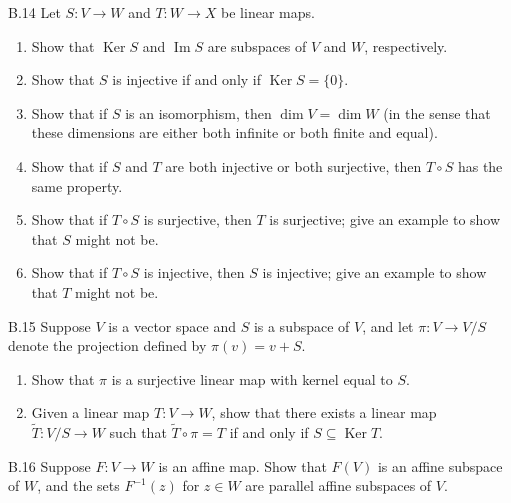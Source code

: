 \begin{exercise}{B.14}
    Let \( S : V \to W \) and \( T : W \to X \) be linear maps.
    \begin{enumerate}[label={(\alph*)}]
        \item Show that \( \operatorname{Ker} S \) and \( \operatorname{Im} S \) are subspaces of \( V \) and \( W \), respectively.
        \item Show that \( S \) is injective if and only if \( \operatorname{Ker} S = \{0\} \).
        \item Show that if \( S \) is an isomorphism, then \( \dim V = \dim W \) (in the sense that these dimensions are either both infinite or both finite and equal).
        \item Show that if \( S \) and \( T \) are both injective or both surjective, then \( T \circ S \) has the same property.
        \item Show that if \( T \circ S \) is surjective, then \( T \) is surjective; give an example to show that \( S \) might not be.
        \item Show that if \( T \circ S \) is injective, then \( S \) is injective; give an example to show that \( T \) might not be.
    \end{enumerate}
\end{exercise}

\begin{exercise}{B.15}
    Suppose \( V \) is a vector space and \( S \) is a subspace of \( V \), and let \( \pi : V \to V/S \) denote the projection defined by \( \pi(v) = v + S \).
    \begin{enumerate}[label={(\alph*)}]
        \item Show that \( \pi \) is a surjective linear map with kernel equal to \( S \).
        \item Given a linear map \( T : V \to W \), show that there exists a linear map \( \widetilde{T} : V/S \to W \) such that \( \widetilde{T} \circ \pi = T \) if and only if \( S \subseteq \operatorname{Ker} T \).
    \end{enumerate}
\end{exercise}

\begin{exercise}{B.16}
    Suppose \( F : V \to W \) is an affine map. Show that \( F(V) \) is an affine subspace of \( W \), and the sets \( F^{-1}(z) \) for \( z \in W \) are parallel affine subspaces of \( V \).
\end{exercise}

